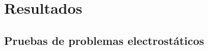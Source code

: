 \documentclass[xcolor=table,serif,handout]{beamer}
\begin{document}
\section{Resultados}
	\subsection{Pruebas de problemas electrostáticos}
	
\end{document}
